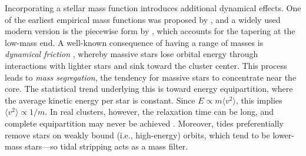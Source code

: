             Incorporating a stellar mass function introduces additional dynamical effects. One of the earliest empirical mass functions was proposed by \citet{1955ApJ...121..161S}, and a widely used modern version is the piecewise form by \citet{2001MNRAS.322..231K}, which accounts for the tapering at the low-mass end. A well-known consequence of having a range of masses is \textit{dynamical friction} \citep{1943ApJ....97..255C,1943ApJ....97..263C,1943ApJ....98...54C}, whereby massive stars lose orbital energy through interactions with lighter stars and sink toward the cluster center. This process leads to \textit{mass segregation}, the tendency for massive stars to concentrate near the core. The statistical trend underlying this is toward energy equipartition, where the average kinetic energy per star is constant. Since $E \propto m \langle v^2 \rangle$, this implies $\langle v^2 \rangle \propto 1/m$. In real clusters, however, the relaxation time can be long, and complete equipartition may never be achieved \citep{2016MNRAS.458.3644B,2025A&A...698A.209Z}. Moreover, tides preferentially remove stars on weakly bound (i.e., high-energy) orbits, which tend to be lower-mass stars—so tidal stripping acts as a mass filter.



